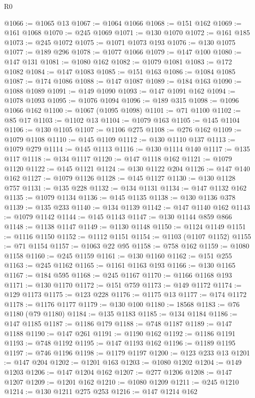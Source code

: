 \begin{lexlean}{R0}
\begin{coremodule}
@1066 := @1065 @13
@1067 := @1064 @1066
@1068 := @151 @162
@1069 := @161 @1068
@1070 := @245 @1069
@1071 := @130 @1070
@1072 := @161 @185
@1073 := @245 @1072
@1075 := @1071 @1073 @193
@1076 := @130 @1075
@1077 := @189 @296
@1078 := @1077 @1066
@1079 := @147 @100
@1080 := @147 @131
@1081 := @1080 @162
@1082 := @1079 @1081
@1083 := @172 @1082
@1084 := @147 @1083
@1085 := @151 @163
@1086 := @1084 @1085
@1087 := @174 @1086
@1088 := @147 @1087
@1089 := @184 @163
@1090 := @1088 @1089
@1091 := @149 @1090
@1093 := @147 @1091 @162
@1094 := @1078 @1093
@1095 := @1076 @1094
@1096 := @189 @315
@1098 := @1096 @1066 @162
@1100 := @1067 (@1095 @1098)
@1101 := @71 @1100
@1102 := @85 @17
@1103 := @1102 @13
@1104 := @1079 @163
@1105 := @145 @1104
@1106 := @130 @1105
@1107 := @1106 @275
@1108 := @276 @162
@1109 := @1079 @1108
@1110 := @145 @1109
@1112 := @130 @1110 @137
@1113 := @1079 @279
@1114 := @145 @1113
@1116 := @130 @1114 @140
@1117 := @135 @117
@1118 := @134 @1117
@1120 := @147 @1118 @162
@1121 := @1079 @1120
@1122 := @145 @1121
@1124 := @130 @1122 @204
@1126 := @147 @140 @162
@1127 := @1079 @1126
@1128 := @145 @1127
@1130 := @130 @1128 @757
@1131 := @135 @228
@1132 := @134 @1131
@1134 := @147 @1132 @162
@1135 := @1079 @1134
@1136 := @145 @1135
@1138 := @130 @1136 @378
@1139 := @135 @233
@1140 := @134 @1139
@1142 := @147 @1140 @162
@1143 := @1079 @1142
@1144 := @145 @1143
@1147 := @130 @1144 @859 @866
@1148 := @1138 @1147
@1149 := @1130 @1148
@1150 := @1124 @1149
@1151 := @1116 @1150
@1152 := @1112 @1151
@1154 := @1103 (@1107 @1152)
@1155 := @71 @1154
@1157 := @1063 @22 @95
@1158 := @758 @162
@1159 := @1080 @1158
@1160 := @245 @1159
@1161 := @130 @1160
@1162 := @151 @255
@1163 := @245 @1162
@1165 := @1161 @1163 @193
@1166 := @130 @1165
@1167 := @184 @595
@1168 := @245 @1167
@1170 := @1166 @1168 @193
@1171 := @130 @1170
@1172 := @151 @759
@1173 := @149 @1172
@1174 := @129 @1173
@1175 := @123 @228
@1176 := @1175 @13
@1177 := @174 @1172
@1178 := @1176 @1177
@1179 := @130 @100
@1180 := 18568
@1183 := @76 @1180 (@79 @1180)
@1184 := @135 @1183
@1185 := @134 @1184
@1186 := @147 @1185
@1187 := @1186 @179
@1188 := @748 @1187
@1189 := @147 @1188
@1190 := @147 @261
@1191 := @1190 @162
@1192 := @1186 @1191
@1193 := @748 @1192
@1195 := @147 @1193 @162
@1196 := @1189 @1195
@1197 := @746 @1196
@1198 := @1179 @1197
@1200 := @123 @233 @13
@1201 := @147 @204
@1202 := @1201 @163
@1203 := @1080 @1202
@1204 := @149 @1203
@1206 := @147 @1204 @162
@1207 := @277 @1206
@1208 := @147 @1207
@1209 := @1201 @162
@1210 := @1080 @1209
@1211 := @245 @1210
@1214 := @130 @1211 @275 @253
@1216 := @147 @1214 @162

\end{coremodule}
\end{lexlean}
